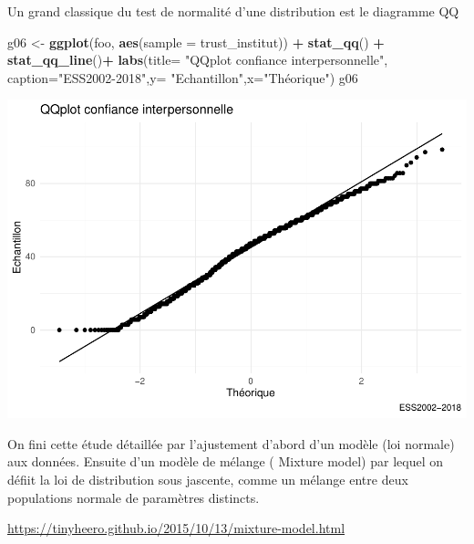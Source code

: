 \documentclass[
]{book}
\newenvironment{Shaded}{\begin{snugshade}}{\end{snugshade}}
\newcommand{\DataTypeTok}[1]{\textcolor[rgb]{0.13,0.29,0.53}{#1}}
\newcommand{\KeywordTok}[1]{\textcolor[rgb]{0.13,0.29,0.53}{\textbf{#1}}}
\newcommand{\NormalTok}[1]{#1}
\newcommand{\OperatorTok}[1]{\textcolor[rgb]{0.81,0.36,0.00}{\textbf{#1}}}
\newcommand{\StringTok}[1]{\textcolor[rgb]{0.31,0.60,0.02}{#1}}
\begin{document}
Un grand classique du test de normalité d'une distribution est le diagramme QQ

\begin{Shaded}
\begin{Highlighting}[]
\NormalTok{g06 <-}\StringTok{ }\KeywordTok{ggplot}\NormalTok{(foo, }\KeywordTok{aes}\NormalTok{(}\DataTypeTok{sample =}\NormalTok{ trust_institut)) }\OperatorTok{+}\StringTok{ }
\StringTok{  }\KeywordTok{stat_qq}\NormalTok{() }\OperatorTok{+}\StringTok{ }\KeywordTok{stat_qq_line}\NormalTok{()}\OperatorTok{+}\StringTok{ }
\StringTok{  }\KeywordTok{labs}\NormalTok{(}\DataTypeTok{title=} \StringTok{"QQplot confiance interpersonnelle"}\NormalTok{, }\DataTypeTok{caption=}\StringTok{"ESS2002-2018"}\NormalTok{,}\DataTypeTok{y=} \StringTok{"Echantillon"}\NormalTok{,}\DataTypeTok{x=}\StringTok{"Théorique"}\NormalTok{) }
\NormalTok{g06}
\end{Highlighting}
\end{Shaded}

\includegraphics{bookdown-demo_files/figure-latex/306-1.pdf}

On fini cette étude détaillée par l'ajustement d'abord d'un modèle (loi normale) aux données. Ensuite d'un modèle de mélange ( Mixture model) par lequel on défiit la loi de distribution sous jascente, comme un mélange entre deux populations normale de paramètres distincts.

\url{https://tinyheero.github.io/2015/10/13/mixture-model.html}

\begin{Shaded}
\end{Shaded}
\end{document}
